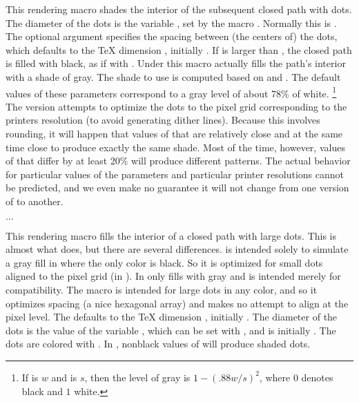 \documentclass[letterpaper]{article}
\begin{document}
This rendering macro shades the interior of the subsequent closed path
with dots. The diameter of the dots is the \MF{} variable ,
set by the macro . Normally this is
\dim{0.5bp}. The optional argument specifies the spacing between (the
centers of) the dots, which defaults to the \TeX{} dimension
, initially \dim{1pt}. If  is larger than
, the closed path is filled with black, as if with
. Under \MP{} this macro actually fills the path's interior
with a shade of gray. The shade to use is computed based on
 and . The default values of these
parameters correspond to a gray level of about 78\% of white.%
    \footnote{If  is $w$ and  is $s$, then
    the level of gray is $1 - (.88w/s)^2$, where $0$ denotes black and
    $1$ white.} %
The \MF{} version attempts to optimize the dots to the pixel grid
corresponding to the printers resolution (to avoid generating dither
lines). Because this involves rounding, it will happen that values of
 that are relatively close and at the same time close to
 produce exactly the same shade. Most of the time, however,
values of  that differ by at least 20\% will produce
different patterns. The actual behavior for particular values of the
parameters and particular printer resolutions cannot be predicted, and
we even make no guarantee it will not change from one version of \mfp{}
to another.

\begin{cd}
$\ldots$%
\end{cd}

This rendering macro fills the interior of a closed path with large
dots. This is almost what  does, but there are several
differences.  is intended solely to simulate a gray fill in
\MF{} where the only color is black. So it is optimized for small dots
aligned to the pixel grid (in \MF{}). In \MP{}  only fills with
gray and is intended merely for compatibility. The macro 
is intended for large dots in any color, and so it optimizes spacing (a
nice hexagonal array) and makes no attempt to align at the pixel level.
The  defaults to the \TeX{} dimension ,
initially \dim{10pt}. The diameter of the dots is the value of the \MF{}
variable , which can be set with
, and is initially \dim{5bp}. The dots
are colored with . In
\MF{}, nonblack values of  will produce shaded dots.
\end{document}
